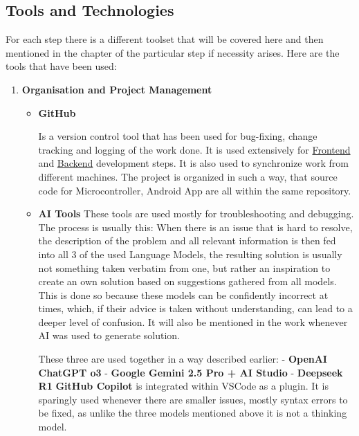 \subsection{Tools and Technologies}
For each step there is a different toolset that will be covered here and then mentioned in the chapter of the particular step if necessity arises. Here are the tools that have been used:

\begin{enumerate}
	\item\textbf{Organisation and Project Management}
	\begin{itemize}
		\item\textbf{GitHub}
		
		Is a version control tool that has been used for bug-fixing, change tracking and logging of the work done. It is used extensively for \hyperref[sec:FrontenddDev]{Frontend} and \hyperref[sec:Backenddev]{Backend} development steps. It is also used to synchronize work from different machines. The project is organized in such a way, that source code for Microcontroller, Android App are all within the same repository.
		\item\textbf{AI Tools}
		\newline These tools are used mostly for troubleshooting and debugging. The process is usually this: When there is an issue that is hard to resolve, the description of the problem and all relevant information is then fed into all 3 of the used Language Models, the resulting solution is usually not something taken verbatim from one, but rather an inspiration to create an own solution based on suggestions gathered from all models. This is done so because these models can be confidently incorrect at times, which, if their advice is taken without understanding, can lead to a deeper level of confusion. It will also be mentioned in the work whenever AI was used to generate solution. 
		
		These three are used together in a way described earlier:
		\newline - \textbf{OpenAI ChatGPT o3}
		\newline - \textbf{Google Gemini 2.5 Pro + AI Studio}
		\newline - \textbf{Deepseek R1}
		\newline \textbf{GitHub Copilot} is integrated within \ac{VSCode} as a plugin. It is sparingly used whenever there are smaller issues, mostly syntax errors to be fixed, as unlike the three models mentioned above it is not a thinking model.
		

\end{itemize}
\end{enumerate}
